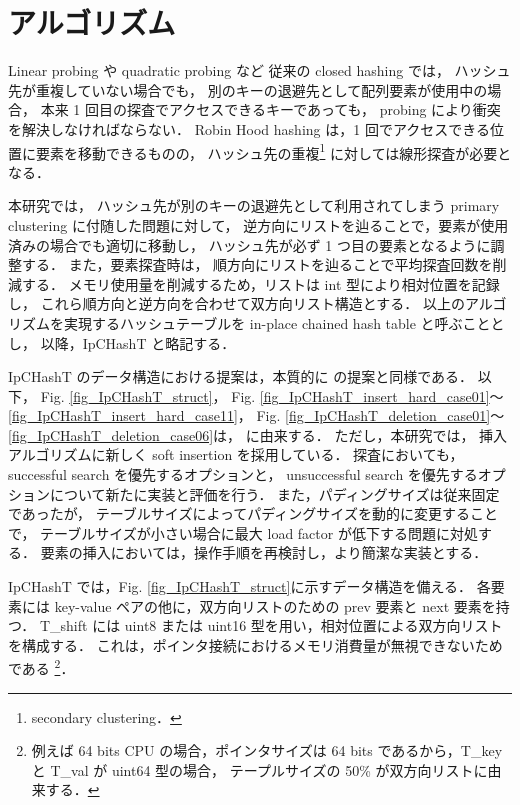 \chapter{アルゴリズム}
\label{chap_Algorism}

Linear probing や quadratic probing など
従来の closed hashing では，
ハッシュ先が重複していない場合でも，
別のキーの退避先として配列要素が使用中の場合，
本来 1 回目の探査でアクセスできるキーであっても，
probing により衝突を解決しなければならない．
Robin Hood hashing は，1 回でアクセスできる位置に要素を移動できるものの，
ハッシュ先の重複\footnote{secondary clustering．} に対しては線形探査が必要となる．

本研究では，
ハッシュ先が別のキーの退避先として利用されてしまう primary clustering に付随した問題に対して，
逆方向にリストを辿ることで，要素が使用済みの場合でも適切に移動し，
ハッシュ先が必ず 1 つ目の要素となるように調整する．
また，要素探査時は，
順方向にリストを辿ることで平均探査回数を削減する．
メモリ使用量を削減するため，リストは int 型により相対位置を記録し，
これら順方向と逆方向を合わせて双方向リスト構造とする．
以上のアルゴリズムを実現するハッシュテーブルを in-place chained hash table と呼ぶこととし，
以降，IpCHashT と略記する．

IpCHashT のデータ構造における提案は，本質的に \cite{ADMIS2017} の提案と同様である．
以下，
Fig. \ref{fig_IpCHashT_struct}，
Fig. \ref{fig_IpCHashT_insert_hard_case01}〜\ref{fig_IpCHashT_insert_hard_case11}，
Fig. \ref{fig_IpCHashT_deletion_case01}〜\ref{fig_IpCHashT_deletion_case06}は，
\cite{ADMIS2017} に由来する．
ただし，本研究では，
挿入アルゴリズムに新しく soft insertion を採用している．
探査においても，
successful search を優先するオプションと，
unsuccessful search を優先するオプションについて新たに実装と評価を行う．
また，パディングサイズは従来固定であったが，
テーブルサイズによってパディングサイズを動的に変更することで，
テーブルサイズが小さい場合に最大 load factor が低下する問題に対処する．
要素の挿入においては，操作手順を再検討し，より簡潔な実装とする．

IpCHashT では，Fig. \ref{fig_IpCHashT_struct}に示すデータ構造を備える．
各要素には key-value ペアの他に，双方向リストのための prev 要素と next 要素を持つ．
T\_shift には uint8 または uint16 型を用い，相対位置による双方向リストを構成する．
これは，ポインタ接続におけるメモリ消費量が無視できないためである
\footnote{
  例えば 64 bits CPU の場合，ポインタサイズは 64 bits であるから，T\_key と T\_val が uint64 型の場合，
  テープルサイズの 50\% が双方向リストに由来する．
}．

